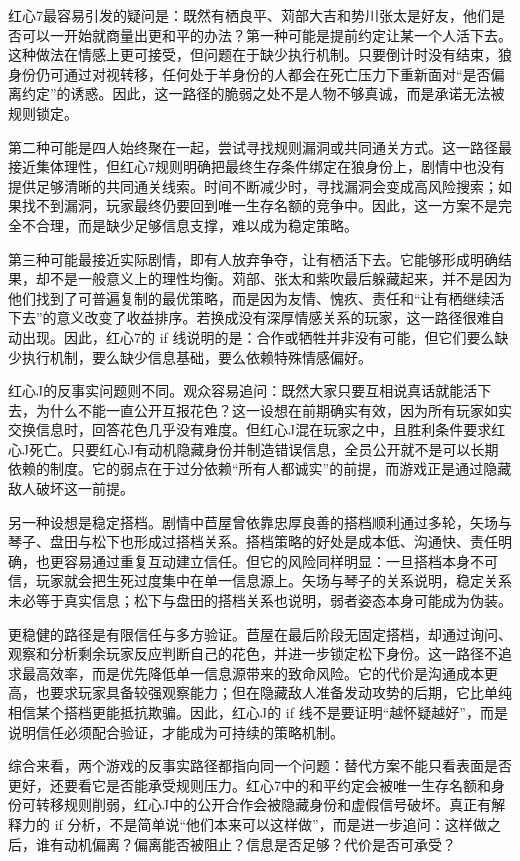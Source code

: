\documentclass{article}
\begin{document}
红心7最容易引发的疑问是：既然有栖良平、苅部大吉和势川张太是好友，他们是否可以一开始就商量出更和平的办法？第一种可能是提前约定让某一个人活下去。这种做法在情感上更可接受，但问题在于缺少执行机制。只要倒计时没有结束，狼身份仍可通过对视转移，任何处于羊身份的人都会在死亡压力下重新面对“是否偏离约定”的诱惑。因此，这一路径的脆弱之处不是人物不够真诚，而是承诺无法被规则锁定。

第二种可能是四人始终聚在一起，尝试寻找规则漏洞或共同通关方式。这一路径最接近集体理性，但红心7规则明确把最终生存条件绑定在狼身份上，剧情中也没有提供足够清晰的共同通关线索。时间不断减少时，寻找漏洞会变成高风险搜索；如果找不到漏洞，玩家最终仍要回到唯一生存名额的竞争中。因此，这一方案不是完全不合理，而是缺少足够信息支撑，难以成为稳定策略。

第三种可能最接近实际剧情，即有人放弃争夺，让有栖活下去。它能够形成明确结果，却不是一般意义上的理性均衡。苅部、张太和紫吹最后躲藏起来，并不是因为他们找到了可普遍复制的最优策略，而是因为友情、愧疚、责任和“让有栖继续活下去”的意义改变了收益排序。若换成没有深厚情感关系的玩家，这一路径很难自动出现。因此，红心7的 if 线说明的是：合作或牺牲并非没有可能，但它们要么缺少执行机制，要么缺少信息基础，要么依赖特殊情感偏好。

红心J的反事实问题则不同。观众容易追问：既然大家只要互相说真话就能活下去，为什么不能一直公开互报花色？这一设想在前期确实有效，因为所有玩家如实交换信息时，回答花色几乎没有难度。但红心J混在玩家之中，且胜利条件要求红心J死亡。只要红心J有动机隐藏身份并制造错误信息，全员公开就不是可以长期依赖的制度。它的弱点在于过分依赖“所有人都诚实”的前提，而游戏正是通过隐藏敌人破坏这一前提。

另一种设想是稳定搭档。剧情中苣屋曾依靠忠厚良善的搭档顺利通过多轮，矢场与琴子、盘田与松下也形成过搭档关系。搭档策略的好处是成本低、沟通快、责任明确，也更容易通过重复互动建立信任。但它的风险同样明显：一旦搭档本身不可信，玩家就会把生死过度集中在单一信息源上。矢场与琴子的关系说明，稳定关系未必等于真实信息；松下与盘田的搭档关系也说明，弱者姿态本身可能成为伪装。

更稳健的路径是有限信任与多方验证。苣屋在最后阶段无固定搭档，却通过询问、观察和分析剩余玩家反应判断自己的花色，并进一步锁定松下身份。这一路径不追求最高效率，而是优先降低单一信息源带来的致命风险。它的代价是沟通成本更高，也要求玩家具备较强观察能力；但在隐藏敌人准备发动攻势的后期，它比单纯相信某个搭档更能抵抗欺骗。因此，红心J的 if 线不是要证明“越怀疑越好”，而是说明信任必须配合验证，才能成为可持续的策略机制。

综合来看，两个游戏的反事实路径都指向同一个问题：替代方案不能只看表面是否更好，还要看它是否能承受规则压力。红心7中的和平约定会被唯一生存名额和身份可转移规则削弱，红心J中的公开合作会被隐藏身份和虚假信号破坏。真正有解释力的 if 分析，不是简单说“他们本来可以这样做”，而是进一步追问：这样做之后，谁有动机偏离？偏离能否被阻止？信息是否足够？代价是否可承受？
\end{document}
